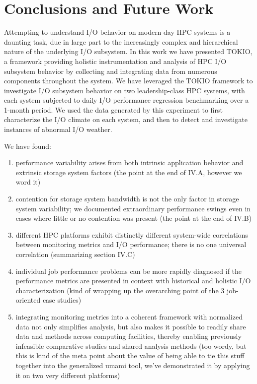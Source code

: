 \section{Conclusions and Future Work} \label{sec:conclusions}

Attempting to understand I/O behavior on modern-day HPC systems is a daunting task, due in large part to the increasingly complex and hierarchical nature of the underlying I/O subsystem.
In this work we have presented TOKIO, a framework providing holistic instrumentation and analysis of HPC I/O subsystem behavior by collecting and integrating data from numerous components throughout the system.
We have leveraged the TOKIO framework to investigate I/O subsystem behavior on two leadership-class HPC systems, with each system subjected to daily I/O performance regression benchmarking over a 1-month period.
We used the data generated by this experiment to first characterize the I/O climate on each system, and then to detect and investigate instances of abnormal I/O weather.

We have found:

\begin{enumerate}
\item performance variability arises from both intrinsic application behavior and extrinsic storage system factors (the point at the end of IV.A, however we word it)
\item contention for storage system bandwidth is not the only factor in storage system variability; we documented extraordinary performance swings even in cases where little or no contention was present (the point at the end of IV.B)
\item different HPC platforms exhibit distinctly different system-wide correlations between monitoring metrics and I/O performance; there is no one universal correlation (summarizing section IV.C)
\item individual job performance problems can be more rapidly diagnosed if the performance metrics are presented in context with historical and holistic I/O characterization (kind of wrapping up the overarching point of the 3 job-oriented case studies)
\item integrating monitoring metrics into a coherent framework with normalized data not only simplifies analysis, but also makes it possible to readily share data and methods across computing facilities, thereby enabling previously infeasible comparative studies and shared analysis methods (too wordy, but this is kind of the meta point about the value of being able to tie this  stuff together into the generalized umami tool, we've demonstrated it by applying it on two very different platforms)
\end{enumerate}

